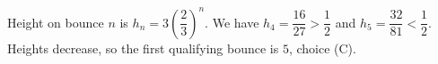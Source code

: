 Height on bounce $n$ is $h_n=3(\dfrac{2}{3})^n$. We have $h_4=\dfrac{16}{27}>\dfrac{1}{2}$ and $h_5=\dfrac{32}{81}<\dfrac{1}{2}$. Heights decrease, so the first qualifying bounce is $\boxed5$, choice (C).
